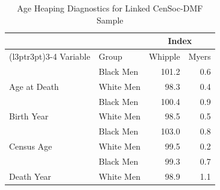 \begin{table}

\caption{\label{tab:heaping}Age Heaping Diagnostics for Linked CenSoc-DMF Sample}
\centering
\begin{tabular}[t]{llrr}
\toprule
\multicolumn{2}{c}{ } & \multicolumn{2}{c}{Index} \\
\cmidrule(l{3pt}r{3pt}){3-4}
Variable & Group & Whipple & Myers\\
\midrule
 & Black Men & 101.2 & 0.6\\

\multirow{-2}{*}{\raggedright\arraybackslash Age at Death} & White Men & 98.3 & 0.4\\

 & Black Men & 100.4 & 0.9\\

\multirow{-2}{*}{\raggedright\arraybackslash Birth Year} & White Men & 98.5 & 0.5\\

 & Black Men & 103.0 & 0.8\\

\multirow{-2}{*}{\raggedright\arraybackslash Census Age} & White Men & 99.5 & 0.2\\

 & Black Men & 99.3 & 0.7\\

\multirow{-2}{*}{\raggedright\arraybackslash Death Year} & White Men & 98.9 & 1.1\\
\bottomrule
\end{tabular}
\end{table}
